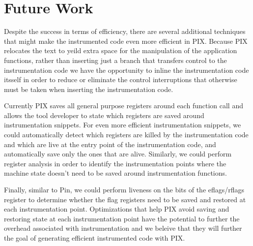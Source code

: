 \section{Future Work}
\label{sec:Future}

Despite the success in terms of efficiency, there are several additional techniques
that might make the instrumented code even more efficient in PIX. Because PIX relocates
the text to yeild extra space for the manipulation of the application functions, 
rather than inserting just a branch
that transfers control to the instrumentation code we have the opportunity to inline
the instrumentation code itsself
in order to reduce or eliminate the control interruptions  that otherwise must be taken 
when inserting the instrumentation code.

Currently PIX saves all general purpose registers around each function call and allows the
tool developer to state which registers are saved around instrumentation snippets. For even more efficient instrumentation
snippets, we could automatically detect which registers are killed by the instrumentation code and which are live at the entry point
of the instrumentation code, and automatically save only the ones that are alive. Similarly, we could perform register 
analysis in order to identify the instrumentation points where the machine state doesn't need to be saved around instrumentation functions. 

Finally, similar to Pin, we could perform liveness on the bits of the eflags/rflags register to determine whether the flag registers need to be saved and
restored at each instrumentation point. Optimizations that help PIX avoid saving and restoring state at each instrumentation point 
have the potential to further the overhead associated with instrumentation and we beleive 
that they will further the goal of generating efficient instrumented code with PIX.


